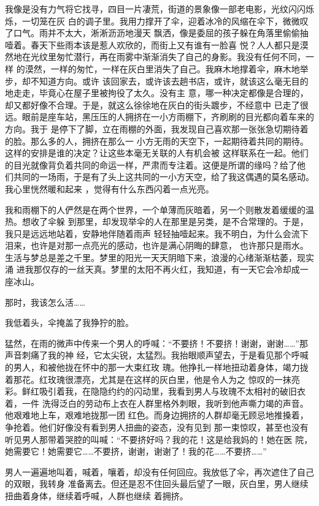 \documentclass[12pt,a4paper]{article}
\begin{document}
		我像是没有力气将它找寻，四目一片凄荒，街道的景象像一部老电影，光纹闪闪烁烁，一切笼在灰
	白的调子里。我用力撑开了伞，迎着冰冷的风缩在伞下，微微叹了口气。雨并不太大，淅淅沥沥地漫天
	飘洒，像是委屈的孩子躲在角落里偷偷抽噎着。春天下些雨本该是惹人欢欣的，而街上又有谁有一脸喜
	悦？人人都只是漠然地在光纹里匆忙潜行，再在雨雾中渐渐消失了自己的身影。我没有任何不同，一样
	的漠然，一样的匆忙，一样在灰白里消失了自己。我麻木地撑着伞，麻木地举步，却不知道方向。或许
	该回家去，或许该去趟书店，或许，就该这么毫无目的地走走，毕竟心在屋子里被拘役了太久。没有主
	意，哪一种决定都像是合理的，却又都好像不合理。于是，就这么徐徐地在灰白的街头踱步，不经意中
	已走了很远。眼前是座车站，黑压压的人拥挤在一小方雨棚下，齐刷刷的目光都向着车来的方向。我于
	是停下了脚，立在雨棚的外面，我发现自己喜欢那一张张急切期待着的脸。那么多的人，拥挤在那么一
	小方无雨的天空下，一起期待着共同的期待。这样的安排是谁的决定？让这些本毫无关联的人有机会被
	这样联系在一起。他们的目光就像背负着共同的命运一样，严肃而专注着。这便是所谓的缘吗？给了他
	们共同的一场雨，于是有了头上这共同的一小方天空，给了我这偶遇的莫名感动。我心里恍然暖和起来
	，觉得有什么东西闪着一点光亮。

		我和雨棚下的人俨然是在两个世界，一个单薄而灰暗着，另一个则散发着缓缓的温热。想收了伞躲
	到那里，却发现举伞的人在那里是另类，是不合常理的。于是，我只是远远地站着，安静地伴随着雨声
	轻轻抽噎起来。我不明白，为什么会流下泪来，也许是对那一点亮光的感动，也许是满心阴晦的肆意，
	也许那只是雨水。生活与梦总是差之千里。梦里的阳光一天天阴暗下来，浪漫的心绪渐渐枯萎，现实涌
	进我那仅存的一丝天真。梦里的太阳不再火红，我知道，有一天它会冷却成一座冰山。

		那时，我该怎么活……

		我低着头，伞掩盖了我狰狞的脸。

		猛然，在雨的微声中传来一个男人的呼喊：“不要挤！不要挤！谢谢，谢谢……”那声音刺痛了我的神
	经，它太尖锐，太猛烈。我抬眼顺声望去，于是看见那个呼喊的男人，和被他拢在怀中的那一大束红玫
	瑰。他挣扎一样地扭动着身体，竭力拢着那花。红玫瑰很漂亮，尤其是在这样的灰白里，他是令人为之
	惊叹的一抹亮彩。鲜红吸引着我，在隐隐约约的闪动里，我看到男人与玫瑰不太相衬的破旧衣着，一件
	洗得泛白的劳动布上衣在人群里格外刺眼，我听到他声嘶力竭的声音。他艰难地上车，艰难地拢那一团
	红色。而身边拥挤的人群却毫无顾忌地推搡着，争抢着。他们好像没有看到男人扭曲的姿态，没有见到
	那一束惊叹，甚至也没有听见男人那带着哭腔的叫喊：“不要挤好吗？我的花！这是给我妈的！她在医
	院，她需要它！她需要它……不要挤，谢谢，谢谢了！我的花……不要挤……”

		男人一遍遍地叫着，喊着，嚷着，却没有任何回应。我放低了伞，再次遮住了自己的双眼，我转身
	准备离去。但还是忍不住回头最后望了一眼，灰白里，男人继续扭曲着身体，继续着呼喊，人群也继续
	着拥挤。
\end{document}
